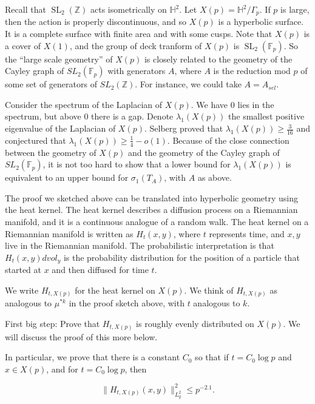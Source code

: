 \documentclass[12pt]{amsart}
\newcommand{\F}{\mathbb{F}}
\newcommand{\FF}{\mathbb{F}}
\newcommand{\ZZ}{\mathbb{Z}}
\begin{document}
Recall that $\operatorname{SL}_2(\ZZ)$ acts isometrically on $\mathbb{H}^2$. Let $X(p)=\mathbb{H}^2/\Gamma_p$.   If $p$ is large,  then the action is properly discontinuous,  and so $X(p)$ is a hyperbolic surface.   It is a complete surface with finite area and with some cusps.   Note 
that $X(p)$ is a cover of $X(1)$, and the group of deck tranform of $X(p)$ is $\operatorname{SL}_2(\F_p)$.   So the ``large scale geometry'' of $X(p)$ is closely related to the geometry of the Cayley graph of $SL_2(\FF_p)$ with generators $A$,  where $A$ is the reduction mod $p$ of some set of generators of $SL_2(\ZZ)$.   For instance,  we could take $A = A_{sel}$.  

Consider the spectrum of the Laplacian of $X(p)$. We have $0$ lies in the spectrum, but above $0$ there is a gap. Denote $\lambda_1(X(p))$ the smallest positive eigenvalue of the Laplacian of $X(p)$. Selberg proved that $\lambda_1(X(p))\ge \frac 3{16}$ and conjectured that $\lambda_1(X(p))\ge \frac{1}{4}-o(1)$.   Because of the close connection between the geometry of $X(p)$ and the geometry of the Cayley graph of $SL_2(\FF_p)$,  it is not too hard to show that a lower bound for $\lambda_1(X(p))$ is equivalent to an upper bound for $\sigma_1(T_A)$,  with $A$ as above.

The proof we sketched above can be translated into hyperbolic geometry using the heat kernel.   The heat kernel describes a diffusion process on a Riemannian manifold,  and it is a continuous analogue of a random walk.   The heat kernel on a Riemannian manifold is written as $H_t(x,y)$,  where $t$ represents time,  and $x,y$ live in the Riemannian manifold.   The probabilistic interpretation is that $H_t(x,y) dvol_y$ is the probability distribution for the position of a particle that started at $x$ and then diffused for time $t$.   


\newcommand{\HH}{\mathbb{H}}

We write $H_{t, X(p)}$ for the heat kernel on $X(p)$.   We think of $H_{t, X(p)}$ as analogous to $\mu^{*k}$ in the proof sketch above,  with $t$ analogous to $k$.   

First big step: Prove that $H_{t, X(p)}$ is roughly evenly distributed on $X(p)$.  We will discuss the proof of this more below.  

In particular,  we prove that there is a constant $C_0$ so that if $t = C_0 \log p$ and $x \in X(p)$,  and for $t = C_0 \log p$,  then 

$$\| H_{t, X(p)}(x, y) \|_{L^2_y}^2 \le p^{- 2.1}. $$
\end{document}
